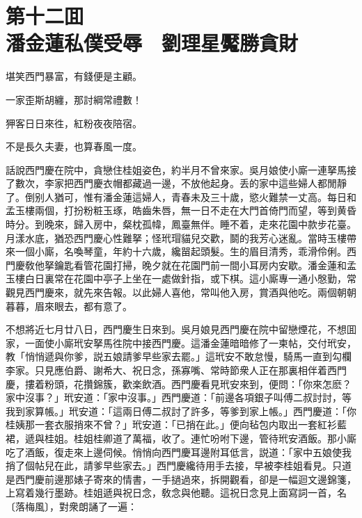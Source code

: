 
\chapter*{第十二囬　\\潘金蓮私僕受辱　劉理星魘勝貪財}


\begin{myquote}
堪笑西門暴富，有錢便是主顧。

一家歪斯胡纏，那討綱常禮數！

狎客日日來徃，紅粉夜夜陪宿。

不是長久夫妻，也算春風一度。
\end{myquote}

話說西門慶在院中，貪戀住桂姐姿色，約半月不曾來家。吳月娘使小廝一連拏馬接了數次，李家把西門慶衣帽都藏過一邊，不放他起身。丢的家中這些婦人都閒靜了。倒别人猶可，惟有潘金蓮這婦人，青春未及三十歲，慾火難禁一丈高。每日和孟玉樓兩個，打扮粉粧玉琢，皓齒朱唇，無一日不走在大門首倚門而望，等到黄昏時分。到晚來，歸入房中，粲枕孤幃，鳳臺無伴。睡不着，走來花園中款步花臺。月漾水底，猶恐西門慶心性難拏；怪玳瑁貓兒交歡，鬬的我芳心迷亂。當時玉樓帶來一個小廝，名喚琴童，年約十六歲，纔㽞起頭髮。生的眉目清秀，乖滑伶俐。西門慶敎他拏鑰匙看管花園打掃，晚夕就在花園門前一間小耳房内安歇。潘金蓮和孟玉樓白日裏常在花園中亭子上坐在一處做針指，或下棋。這小廝專一通小慇勤，常觀見西門慶來，就先來告報。以此婦人喜他，常叫他入房，賞酒與他吃。兩個朝朝暮暮，眉來眼去，都有意了。

不想將近七月廿八日，西門慶生日來到。吳月娘見西門慶在院中留戀煙花，不想囬家，一面使小廝玳安拏馬徃院中接西門慶。這潘金蓮暗暗修了一柬帖，交付玳安，教「悄悄遞與你爹，説五娘請爹早些家去罷。」這玳安不敢怠慢，騎馬一直到勾欄李家。只見應伯爵、謝希大、祝日念，孫寡嘴、常時節衆人正在那裏相伴着西門慶，摟着粉頭，花攢錦簇，歡楽飲酒。西門慶看見玳安來到，便問：「你來怎麽？家中沒事？」玳安道：「家中沒事。」西門慶道：「前邊各項銀子叫傅二叔討討，等我到家算帳。」玳安道：「這兩日傅二叔討了許多，等爹到家上帳。」西門慶道：「你桂姨那一套衣服捎來不曾？」玳安道：「已捎在此。」便向毡包内取出一套紅衫藍裙，遞與桂姐。桂姐桂卿道了萬福，收了。連忙吩咐下邊，管待玳安酒飯。那小廝吃了酒飯，復走來上邊伺候。悄悄向西門慶耳邊附耳低言，説道：「家中五娘使我捎了個帖兒在此，請爹早些家去。」西門慶纔待用手去接，早被李桂姐看見。只道是西門慶前邊那婊子寄來的情書，一手撾過來，拆開觀看，卻是一幅迴文邊錦箋，上寫着幾行墨跡。桂姐遞與祝日念，敎念與他聽。這祝日念見上面寫詞一首，名〔落梅風〕，對衆朗誦了一遍：


